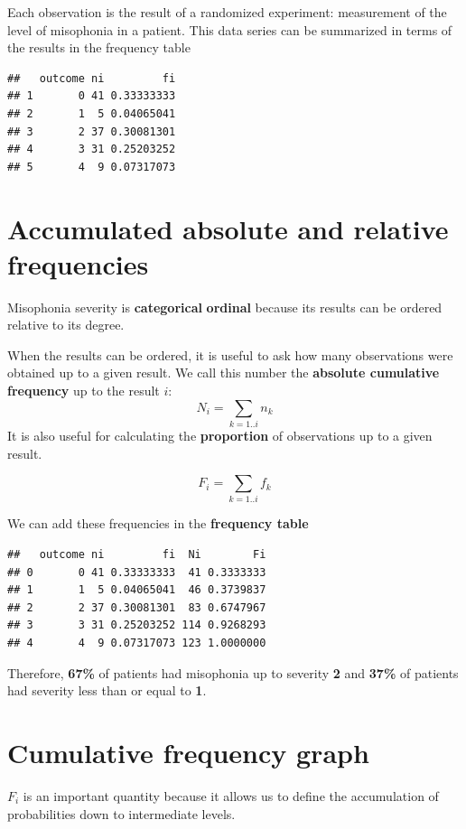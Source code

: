\documentclass[
]{book}
\begin{document}
Each observation is the result of a randomized experiment: measurement of the level of misophonia in a patient. This data series can be summarized in terms of the results in the frequency table

\begin{verbatim}
##   outcome ni         fi
## 1       0 41 0.33333333
## 2       1  5 0.04065041
## 3       2 37 0.30081301
## 4       3 31 0.25203252
## 5       4  9 0.07317073
\end{verbatim}

\hypertarget{accumulated-absolute-and-relative-frequencies}{%
\section{Accumulated absolute and relative frequencies}\label{accumulated-absolute-and-relative-frequencies}}

Misophonia severity is \textbf{categorical} \textbf{ordinal} because its results can be ordered relative to its degree.

When the results can be ordered, it is useful to ask how many observations were obtained up to a given result. We call this number the \textbf{absolute cumulative frequency} up to the result \(i\):
\[N_i =\sum_{k= 1..i } n_k\]
It is also useful for calculating the \textbf{proportion} of observations up to a given result.

\[F_i =\sum_{k= 1..i } f_k\]

We can add these frequencies in the \textbf{frequency table}

\begin{verbatim}
##   outcome ni         fi  Ni        Fi
## 0       0 41 0.33333333  41 0.3333333
## 1       1  5 0.04065041  46 0.3739837
## 2       2 37 0.30081301  83 0.6747967
## 3       3 31 0.25203252 114 0.9268293
## 4       4  9 0.07317073 123 1.0000000
\end{verbatim}

Therefore, \textbf{67\%} of patients had misophonia up to severity \textbf{2} and \textbf{37\%} of patients had severity less than or equal to \textbf{1}.

\hypertarget{cumulative-frequency-graph}{%
\section{Cumulative frequency graph}\label{cumulative-frequency-graph}}

\(F_i\) is an important quantity because it allows us to define the accumulation of probabilities down to intermediate levels.
\end{document}
